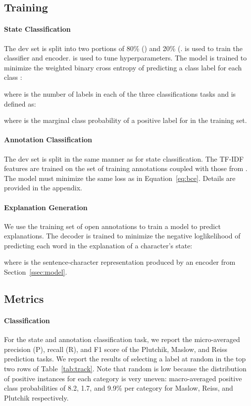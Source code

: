\documentclass[11pt,a4paper]{article}
\begin{document}
\subsection{Training}

\paragraph{State Classification} The dev set  is split into two portions of 80\% () and 20\% (.  is used to train the classifier and encoder.  is used to tune hyperparameters. The model is trained to minimize the weighted binary cross entropy of predicting a class label  for each class :
\vspace*{-1mm}


\noindent where  is the number of labels in each of the three classifications tasks and  is defined as:



\noindent where  is the marginal class probability of a positive label for  in the training set.
\vspace{-1mm}
\paragraph{Annotation Classification} The dev set is split in the same manner as for state classification. The TF-IDF features are trained on the set of training annotations  coupled with those from . The model must minimize the same loss as in Equation~\ref{eq:bce}. Details are provided in the appendix.
\vspace{-1mm}
\paragraph{Explanation Generation}

We use the training set of open annotations to train a model to predict explanations. The decoder is trained to minimize the negative loglikelihood of predicting each word in the explanation of a character's state:
\vspace{-1mm}


\noindent where  is the sentence-character representation produced by an encoder from Section~\ref{ssec:model}.



\subsection{Metrics}

\paragraph{Classification} For the state and annotation classification task, we report the micro-averaged precision (P), recall (R), and F1 score of the Plutchik, Maslow, and Reiss prediction tasks. We report the results of selecting a label at random in the top two rows of Table~\ref{tab:track}. Note that random is low because the distribution of positive instances for each category is very uneven: macro-averaged positive class probabilities of 8.2, 1.7, and  9.9\% per category for Maslow, Reiss, and Plutchik respectively.\vspace{-1mm}
\end{document}
